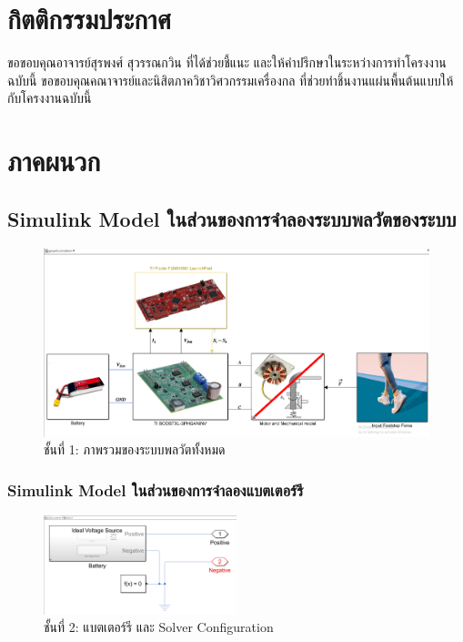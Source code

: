 \documentclass[11pt,a4paper]{article}
\begin{document}



\section{กิตติกรรมประกาศ}
ขอขอบคุณอาจารย์สุรพงศ์ สุวรรณกวิน ที่ได้ช่วยชี้แนะ และให้คำปรึกษาในระหว่างการทำโครงงานฉบับนี้ ขอขอบคุณคณาจารย์และนิสิตภาควิชาวิศวกรรมเครื่องกล ที่ช่วยทำชิ้นงานแผ่นพื้นต้นแบบให้กับโครงงานฉบับนี้

\section{ภาคผนวก}

\subsection{Simulink Model ในส่วนของการจำลองระบบพลวัตของระบบ}

\begin{figure}[H]
    \centering
    \includegraphics[width=\textwidth]{layer0.png}
    \caption{ชั้นที่ 1: ภาพรวมของระบบพลวัตทั้งหมด}
\end{figure}

\subsubsection{Simulink Model ในส่วนของการจำลองแบตเตอร์รี}

\begin{figure}[H]
    \centering
    \includegraphics[width=0.5\textwidth]{layer1.png}
    \caption{ชั้นที่ 2: แบตเตอร์รี และ Solver Configuration}
\end{figure}
\end{document}

